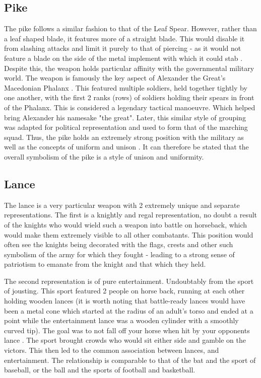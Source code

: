 \documentclass{article}
\begin{document}
\subsection*{Pike}
The pike follows a similar fashion to that of the Leaf Spear. However, rather than a leaf shaped blade, it features more of a straight blade. This would disable it from slashing attacks and limit it purely to that of piercing - as it would not feature a blade on the side of the metal implement with which it could stab \parencite{hayes1943irish}. Despite this, the weapon holds particular affinity with the governmental military world. The weapon is famously the key aspect of Alexander the Great's Macedonian Phalanx \parencite{lazenby2016phalanx}. This featured multiple soldiers, held together tightly by one another, with the first 2 ranks (rows) of soldiers holding their spears in front of the Phalanx. This is considered a legendary tactical manoeuvre. Which helped bring Alexander his namesake "the great". Later, this similar style of grouping was adapted for political representation and used to form that of the marching squad. Thus, the pike holds an extremely strong position with the military as well as the concepts of uniform and unison \parencite{bosworth2010argeads}. It can therefore be stated that the overall symbolism of the pike is a style of unison and uniformity.

\subsection*{Lance}
The lance is a very particular weapon with 2 extremely unique and separate representations. The first is a knightly and regal representation, no doubt a result of the knights who would wield such a weapon into battle on horseback, which would make them extremely visible to all other combatants. This position would often see the knights being decorated with the flags, crests and other such symbolism of the army for which they fought - leading to a strong sense of patriotism to emanate from the knight and that which they held.

The second representation is of pure entertainment. Undoubtably from the sport of jousting. This sport featured 2 people on horse back, running at each other holding wooden lances (it is worth noting that battle-ready lances would have been a metal cone which started at the radius of an adult's torso and ended at a point while the entertainment lance was a wooden cylinder with a smoothly curved tip). The goal was to not fall off your horse when hit by your opponents lance \parencite{fallows2010jousting}. The sport brought crowds who would sit either side and gamble on the victors. This then led to the common association between lances, and entertainment. The relationship is comparable to that of the bat and the sport of baseball, or the ball and the sports of football and basketball.
\end{document}
